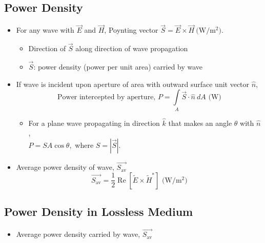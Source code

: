 \documentclass[a4paper]{article}
\begin{document}
\subsection{Power Density}
\begin{itemize}
    \item For any wave with $\overrightarrow{E}$ and $\overrightarrow{H}$,
    Poynting vector $\overrightarrow{S} = \overrightarrow{E}\times\overrightarrow{H}\ \text{(W/}\text{m}^2)$.
    \begin{itemize}[label=$\circ$]
        \item Direction of $\overrightarrow{S}$ along direction of wave propagation
        \item $\overrightarrow{S}$: power density (power per unit area) carried by wave
    \end{itemize}
    \item If wave is incident upon aperture of area with outward surface unit vector $\hat{n}$,
    $$\text{Power intercepted by aperture, }P=\int\limits_A \overrightarrow{S}\cdot\hat{n}\ dA\text{ (W)}$$
    \begin{itemize}[label=$\circ$]
        \item For a plane wave propagating in direction $\hat{k}$ that makes an angle $\theta$ with $\hat{n}$,\\
        $P = SA\cos\theta,$ where $S=|\overrightarrow{S}|$.
    \end{itemize}
    \item Average power density of wave, $\overrightarrow{S_\text{av}}$
    $$\overrightarrow{S_\text{av}} = \frac{1}{2}\operatorname{Re}\left[\widetilde{E}\times\widetilde{H}^*\right]\text{ (W/}\text{m}^2)$$
\end{itemize}

\subsection{Power Density in Lossless Medium}
\begin{itemize}
    \item Average power density carried by wave, $\overrightarrow{S_\text{av}}$
    \begin{center}
    \end{center}
\end{itemize}
\end{document}

